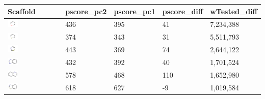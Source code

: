 \begin{longtable}
\centering
\begin{tabular}{ p{}p{}p{}p{}p{} }
\textbf{Scaffold} & \textbf{pscore\_pc2} & \textbf{pscore\_pc1} & \textbf{pscore\_diff} & \textbf{wTested\_diff} \\
\hline
\includegraphics[align=c,width=0.2\textwidth]{data/badapple/scaf_01.png} & 436 & 395 & 41 & 7,234,388 \\
\includegraphics[align=c,width=0.2\textwidth]{data/badapple/scaf_02.png} & 374 & 343 & 31 & 5,511,793 \\
\includegraphics[align=c,width=0.2\textwidth]{data/badapple/scaf_03.png} & 443 & 369 & 74 & 2,644,122 \\
\includegraphics[align=c,width=0.2\textwidth]{data/badapple/scaf_04.png} & 432 & 392 & 40 & 1,701,524 \\
\includegraphics[align=c,width=0.2\textwidth]{data/badapple/scaf_05.png} & 578 & 468 & 110 & 1,652,980 \\
\includegraphics[align=c,width=0.2\textwidth]{data/badapple/scaf_06.png} & 618 & 627 & -9 & 1,019,584 \\

\end{tabular}
\end{longtable}

